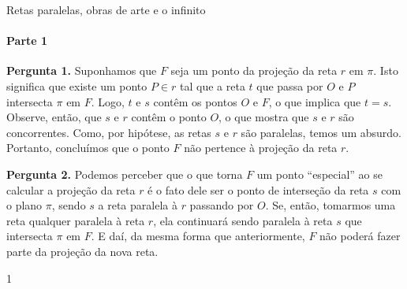 \clearmargin
\clearmargin
\begin{answer}{Retas paralelas, obras de arte e o infinito}
{
\paragraph{Parte 1}
\textbf{Pergunta 1.} Suponhamos que \(F\) seja um ponto da projeção da reta \(r\) em \(\pi\). Isto significa que existe um ponto \(P\in r\) tal que a reta \(t\) que passa por \(O\) e \(P\) intersecta \(\pi\) em \(F\). Logo, \(t\) e \(s\) contêm os pontos \(O\) e \(F\), o que implica que \(t=s\). Observe, então, que \(s\) e \(r\) contêm o ponto \(O\), o que mostra que \(s\) e \(r\) são concorrentes. Como, por hipótese, as retas \(s\) e \(r\) são paralelas, temos um absurdo. Portanto, concluímos que o ponto \(F\) não pertence à projeção da reta \(r\).

\textbf{Pergunta 2.} Podemos perceber que o que torna \(F\) um ponto “especial” ao se calcular a projeção da reta \(r\) é o fato dele ser o ponto de interseção da reta \(s\) com o plano \(\pi\), sendo \(s\) a reta paralela à \(r\) passando por \(O\). Se, então, tomarmos uma reta qualquer paralela à reta \(r\), ela continuará sendo paralela à reta \(s\) que intersecta \(\pi\) em \(F\). E daí, da mesma forma que anteriormente, \(F\) não poderá fazer parte da projeção da nova reta.
}{1}
\end{answer}
\clearmargin
